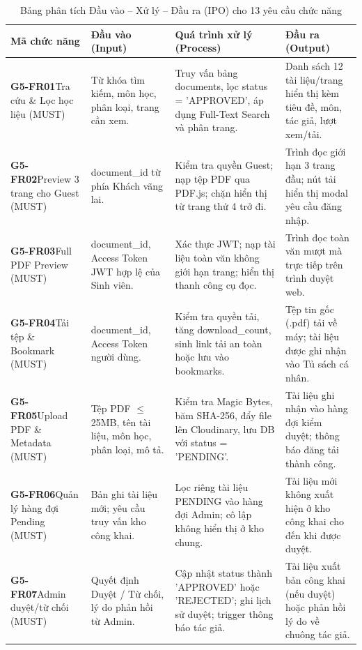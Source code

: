 \begin{table}[htbp]
\centering
\footnotesize
\caption{Bảng phân tích Đầu vào -- Xử lý -- Đầu ra (IPO) cho 13 yêu cầu chức năng}
\label{tab:ipo}
\begin{tabularx}{\textwidth}{|p{2.6cm}|X|X|X|}
\hline
\textbf{Mã chức năng} & \textbf{Đầu vào (Input)} & \textbf{Quá trình xử lý (Process)} & \textbf{Đầu ra (Output)} \\
\hline
\textbf{G5-FR01}\newline Tra cứu \& Lọc học liệu (MUST) & Từ khóa tìm kiếm, môn học, phân loại, trang cần xem. & Truy vấn bảng documents, lọc status = 'APPROVED', áp dụng Full-Text Search và phân trang. & Danh sách 12 tài liệu/trang hiển thị kèm tiêu đề, môn, tác giả, lượt xem/tải. \\
\hline
\textbf{G5-FR02}\newline Preview 3 trang cho Guest (MUST) & document\_id từ phía Khách vãng lai. & Kiểm tra quyền Guest; nạp tệp PDF qua PDF.js; chặn hiển thị từ trang thứ 4 trở đi. & Trình đọc giới hạn 3 trang đầu; nút tải hiển thị modal yêu cầu đăng nhập. \\
\hline
\textbf{G5-FR03}\newline Full PDF Preview (MUST) & document\_id, Access Token JWT hợp lệ của Sinh viên. & Xác thực JWT; nạp tài liệu toàn văn không giới hạn trang; hiển thị thanh công cụ đọc. & Trình đọc toàn văn mượt mà trực tiếp trên trình duyệt web. \\
\hline
\textbf{G5-FR04}\newline Tải tệp \& Bookmark (MUST) & document\_id, Access Token người dùng. & Kiểm tra quyền tải, tăng download\_count, sinh link tải an toàn hoặc lưu vào bookmarks. & Tệp tin gốc (.pdf) tải về máy; tài liệu được ghi nhận vào Tủ sách cá nhân. \\
\hline
\textbf{G5-FR05}\newline Upload PDF \& Metadata (MUST) & Tệp PDF $\le$ 25MB, tên tài liệu, môn học, phân loại, mô tả. & Kiểm tra Magic Bytes, băm SHA-256, đẩy file lên Cloudinary, lưu DB với status = 'PENDING'. & Tài liệu ghi nhận vào hàng đợi kiểm duyệt; thông báo đăng tải thành công. \\
\hline
\textbf{G5-FR06}\newline Quản lý hàng đợi Pending (MUST) & Bản ghi tài liệu mới; yêu cầu truy vấn kho công khai. & Lọc riêng tài liệu PENDING vào hàng đợi Admin; cô lập không hiển thị ở kho chung. & Tài liệu mới không xuất hiện ở kho công khai cho đến khi được duyệt. \\
\hline
\textbf{G5-FR07}\newline Admin duyệt/từ chối (MUST) & Quyết định Duyệt / Từ chối, lý do phản hồi từ Admin. & Cập nhật status thành 'APPROVED' hoặc 'REJECTED'; ghi lịch sử duyệt; trigger thông báo tác giả. & Tài liệu xuất bản công khai (nếu duyệt) hoặc phản hồi lý do về chuông tác giả. \\

\end{tabularx}
\end{table}
